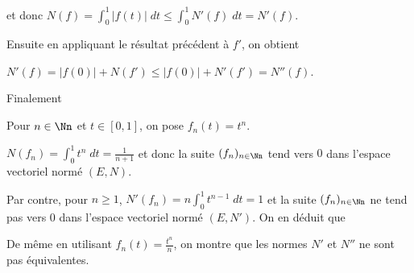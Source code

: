 {{et donc $N(f) =\int_{0}^{1}|f(t)|\;dt\leqslant\int_{0}^{1}N'(f)\;dt=N'(f)$.

Ensuite en appliquant le résultat précédent à $f'$,  on obtient 

\begin{center}
$N'(f)=|f(0)|+N(f')\leqslant|f(0)|+N'(f')=N''(f)$.
\end{center}

Finalement 

\begin{center}
\end{center}

Pour $n\in\Nn$ et $t\in[0,1]$, on pose $f_n(t) = t^n$. 

$N(f_n)=\int_{0}^{1}t^n\;dt= \frac{1}{n+1}$ et donc la suite $(f_n)_{n\in\Nn}$ tend vers $0$ dans l'espace vectoriel normé $(E,N)$.

Par contre, pour $n\geqslant1$, $N'(f_n)=n\int_{0}^{1}t^{n-1}\;dt=1$ et la suite $(f_n)_{n\in\Nn}$  ne tend pas vers $0$ dans l'espace vectoriel normé $(E,N')$. On en déduit que

\begin{center}
\end{center}

De même en utilisant $f_n(t)= \frac{t^n}{n}$, on montre que les normes $N'$ et $N''$ ne sont pas équivalentes.
}
}
